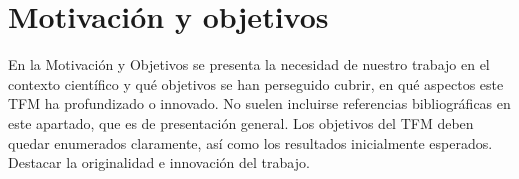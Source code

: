 \newpage\mbox{}\thispagestyle{empty}

\chapter{Motivación y objetivos}

En la Motivación y Objetivos se presenta la necesidad de nuestro trabajo en el 
   contexto científico y qué objetivos se han perseguido cubrir, en qué aspectos este TFM 
   ha profundizado o innovado. No suelen incluirse referencias bibliográficas en este 
   apartado, que es de presentación general. Los objetivos del TFM deben quedar 
   enumerados claramente, así como los resultados inicialmente esperados. Destacar la 
   originalidad e innovación del trabajo.

